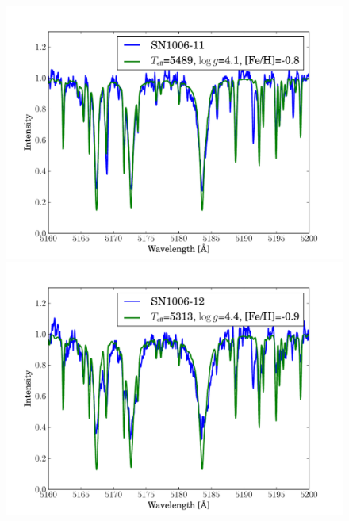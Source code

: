 \begin{figure}[tb]
   \label{fig:sn1006_candfit}
\end{figure}\begin{figure}[tb] %
   \centering
\includegraphics[width=1.1\textwidth, trim=0 0mm 0 10mm, clip]{chapter_sn1006/plots/gold_spectra/sn1006_11.pdf}
\includegraphics[width=1.1\textwidth, trim=0 0mm 0 10mm, clip]{chapter_sn1006/plots/gold_spectra/sn1006_12.pdf}


\end{figure}
